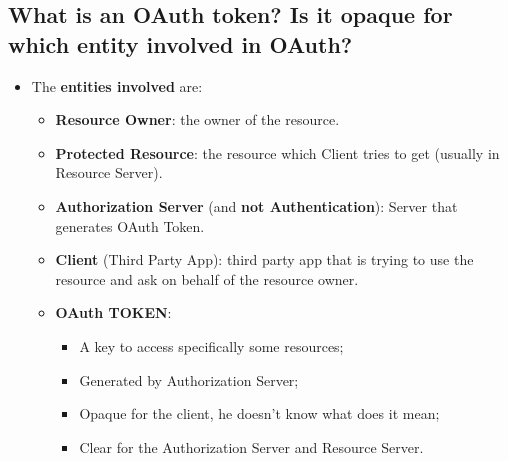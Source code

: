 \documentclass[9pt, letterpaper]{article}
\begin{document}
\subsection{What is an OAuth token? Is it opaque for which entity involved in OAuth?}
\begin{itemize}
	\item The \textbf{entities involved} are:
	\begin{itemize}
		\item \textbf{Resource Owner}: the owner of the resource.
		\item \textbf{Protected Resource}: the resource which Client tries to get (usually in Resource Server).
		\item \textbf{Authorization Server} (and \textbf{not Authentication}): Server that generates OAuth Token.
		\item \textbf{Client} (Third Party App): third party app that is trying to use the resource and ask on behalf of the resource owner.
		\item \textbf{OAuth TOKEN}:
		\begin{itemize}
			\item A key to access specifically some resources;
			\item Generated by Authorization Server;
			\item Opaque for the client, he doesn't know what does it mean;
			\item Clear for the Authorization Server and Resource Server.
		\end{itemize}
	\end{itemize}
\end{itemize}

\newpage
\end{document}
